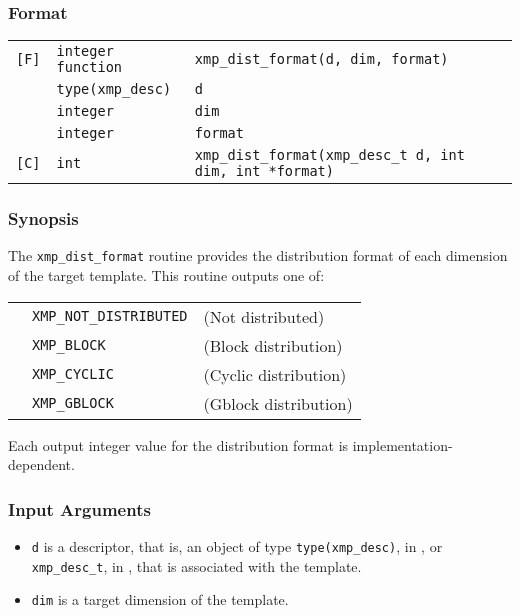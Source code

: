 \subsubsection*{Format}

\begin{tabular}{lll}

\verb![F]!& {\tt integer function}& {\tt xmp\_dist\_format(d, dim, format)}\\
          & {\tt type(xmp\_desc)} & {\tt d}\\
          & {\tt integer} & {\tt dim}\\
          & {\tt integer} & {\tt format}\\

\verb![C]!&  {\tt int}& {\tt xmp\_dist\_format(xmp\_desc\_t d, int dim, int *format)}\\

\end{tabular}

\subsubsection*{Synopsis}

The {\tt xmp\_dist\_format} routine provides the distribution format of each dimension of the target template.
 This routine outputs one of:

\begin{tabular}{lll}
       \hspace{2.5cm} & {\tt XMP\_NOT\_DISTRIBUTED} & (Not distributed)\\
                      & {\tt XMP\_BLOCK}  & (Block distribution) \\
                      & {\tt XMP\_CYCLIC} & (Cyclic distribution) \\
                      & {\tt XMP\_GBLOCK} & (Gblock distribution) \\
\end{tabular}

  Each output integer value for the distribution format is implementation-dependent.


\subsubsection*{Input Arguments}
\begin{itemize}
 \item {\tt d} is a descriptor, that is, an object of type 
       {\tt type(xmp\_desc)}, in {\XMPF}, or {\tt xmp\_desc\_t},
       in {\XMPC}, that is associated with the template.
        \item {\tt dim} is a target dimension of the template.
\end{itemize}

